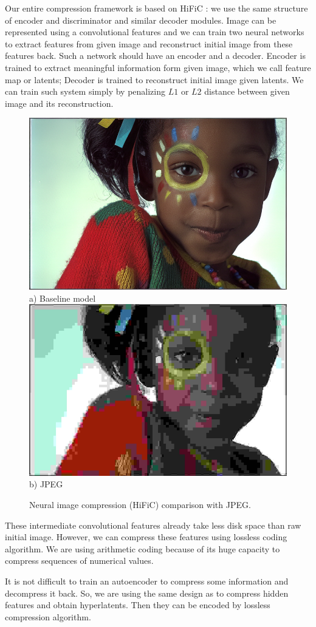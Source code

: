 Our entire compression framework is based on HiFiC \cite{mentzer_high_fidelity_2020}: we use the same structure of encoder and discriminator and similar decoder modules. Image can be represented using a convolutional features and we can train two neural networks to extract features from given image and reconstruct initial image from these features back. Such a network should have an encoder and a decoder. Encoder is trained to extract meaningful information form given image, which we call feature map or latents; Decoder is trained to reconstruct initial image given latents. We can train such system simply by penalizing $L1$ or $L2$ distance between given image and its reconstruction.

\begin{figure}[!ht]
    \centering
    \includegraphics[width=.45\textwidth]{figure/kodim15_HiFiC_Lo.png}
    a) Baseline model
    \includegraphics[width=.45\textwidth]{figure/kodim15_jpg_1x_0.166.jpg}
    b) JPEG
    \caption{Neural image compression (HiFiC) comparison with JPEG.}
    \label{jpeg-hific-comparision}
\end{figure}

These intermediate convolutional features already take less disk space than raw initial image. However, we can compress these features using lossless coding algorithm. We are using arithmetic coding because of its huge capacity to compress sequences of numerical values.

It is not difficult to train an autoencoder to compress some information and decompress it back. So, we are using the same design as \cite{balle_variational_2018} to compress hidden features and obtain hyperlatents. Then they can be encoded by lossless compression algorithm.

